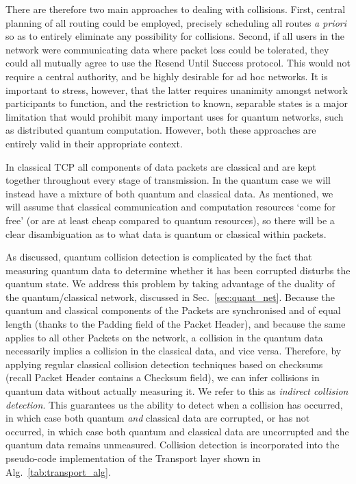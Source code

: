 \documentclass[aps,rmp,twocolumn,amsmath,amssymb,nofootinbib,superscriptaddress]{revtex4}
\begin{document}
There are therefore two main approaches to dealing with collisions. First, central planning of all routing could be employed, precisely scheduling all routes \emph{a priori} so as to entirely eliminate any possibility for collisions. Second, if all users in the network were communicating data where packet loss could be tolerated, they could all mutually agree to use the {\sc Resend Until Success} protocol. This would not require a central authority, and be highly desirable for ad hoc networks. It is important to stress, however, that the latter requires unanimity amongst network participants to function, and the restriction to known, separable states is a major limitation that would prohibit many important uses for quantum networks, such as distributed quantum computation. However, both these approaches are entirely valid in their appropriate context.

In classical TCP all components of data packets are classical and are kept together throughout every stage of transmission. In the quantum case we will instead have a mixture of both quantum and classical data. As mentioned, we will assume that classical communication and computation resources `come for free' (or are at least cheap compared to quantum resources), so there will be a clear disambiguation as to what data is quantum or classical within packets.

As discussed, quantum collision detection is complicated by the fact that measuring quantum data to determine whether it has been corrupted disturbs the quantum state. We address this problem by taking advantage of the duality of the quantum/classical network, discussed in Sec.~\ref{sec:quant_net}. Because the quantum and classical components of the {\sc Packets} are synchronised and of equal length (thanks to the {\sc Padding} field of the {\sc Packet Header}), and because the same applies to all other {\sc Packets} on the network, a collision in the quantum data necessarily implies a collision in the classical data, and vice versa. Therefore, by applying regular classical collision detection techniques based on checksums (recall {\sc Packet Header} contains a {\sc Checksum} field), we can infer collisions in quantum data without actually measuring it. We refer to this as \emph{indirect collision detection}. This guarantees us the ability to detect when a collision has occurred, in which case both quantum \emph{and} classical data are corrupted, or has not occurred, in which case both quantum and classical data are uncorrupted and the quantum data remains unmeasured. Collision detection is incorporated into the pseudo-code implementation of the {\sc Transport} layer shown in Alg.~\ref{tab:transport_alg}.
\end{document}
